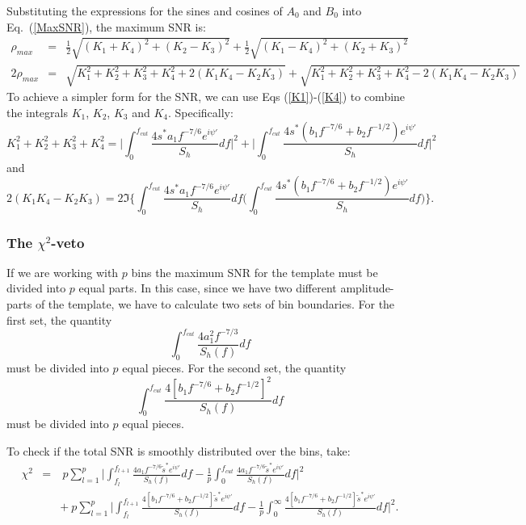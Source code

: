 Substituting the expressions for the sines and cosines of $A_0$ and
$B_0$
into Eq.~(\ref{MaxSNR}), the maximum SNR is:
\begin{eqnarray}
 \rho_{max} &=& \frac{1}{2} \sqrt{(K_1+K_4)^2 + (K_2-K_3)^2} +
\frac{1}{2} \sqrt{(K_1-K_4)^2 +(K_2+K_3)^2}\\
2\rho_{max}&=& \sqrt{ K_1^2 + K_2^2 + K_3^2 +K_4^2 + 2(K_1 K_4
	- K_2 K_3)} + \sqrt{  K_1^2 + K_2^2 + K_3^2 +K_4^2 -2(K_1
	K_4 -  K_2 K_3)} 
\end{eqnarray}
To achieve a simpler form for the SNR, we can use Eqs (\ref{K1})-(\ref{K4}) to 
combine the integrals $K_1$, $K_2$, $K_3$ and $K_4$.
Specifically:
\begin{equation}
K_1^2 + K_2^2 + K_3^2 + K_4^2 = \Big | \int_0^{f_{cut}} \frac{4 s^{\ast} a_1
	f^{-7/6} e^{i \psi'}}{S_h} df \Big |^2 + \Big | \int_0^{f_{cut}}
	\frac{4 s^{\ast} (b_1 f^{-7/6} + b_2 f^{-1/2}) e^{i \psi'}}{S_h} df
	\Big |^2
\end{equation}
and
\begin{equation}
2(K_1 K_4- K_2 K_3) =  2 \Im \Big \{ \int_0^{f_{cut}} \frac{4 s^{\ast} a_1
	f^{-7/6} e^{i \psi'}}{S_h} df \Big (\int_0^{f_{cut}} \frac{4 s^{\ast}
	(b_1 f^{-7/6} + b_2 f^{-1/2}) e^{i \psi'}}{S_h}df\Big ) \Big \}.
\end{equation}

\subsubsection*{The $\chi^2$-veto}
\label{ChisquaredVeto}

If we are working with $p$ bins the maximum SNR for the template must be 
divided into $p$ equal parts. In this case, since we have two different 
amplitude-parts of the template, we have to calculate two sets of bin
boundaries.
For the first set, the quantity
\begin{displaymath}
\int_0^{f_{cut}} \frac{4 a_1^2 f^{-7/3}}{S_h(f)} df
\end{displaymath}
must be divided into $p$ equal pieces.
For the second set, the quantity
\begin{displaymath}
\int_0^{f_{cut}} \frac{4 [b_1 f^{-7/6} + b_2 f^{-1/2}]^2}{S_h(f)} df
\end{displaymath} 
must be divided into $p$ equal pieces.

To check if the total SNR is smoothly distributed over the bins,
take:
\begin{eqnarray}
\chi^2 &=& \: p \sum_{l=1}^p  \Big | \int_{f_l}^{f_{l+1}} \frac{4 a_1 
     f^{-7/6} \tilde{s}^{\ast} e^{i \psi'}}{S_h(f)} df
     - \frac{1}{p} \int_{0}^{f_{cut}} \frac{4 a_1 f^{-7/6}
 \tilde{s}^{\ast} e^{i \psi'}}{S_h(f)} df \Big |^2 \\
      && +\: p\sum_{l=1}^p\Big | \int_{f_l}^{f_{l+1}} \frac{4[b_1 f^{-7/6}
	+ b_2 f^{-1/2} ]
     \tilde{s}^{\ast} e^{i \psi'}}{S_h(f)} df-\frac{1}{p} 
     \int_{0}^{\infty} \frac{4[b_1 f^{-7/6} + b_2 f^{-1/2}]
\tilde{s}^{\ast} e^{i \psi'}}{S_h(f)} df\Big |^2. \\
\end{eqnarray}

